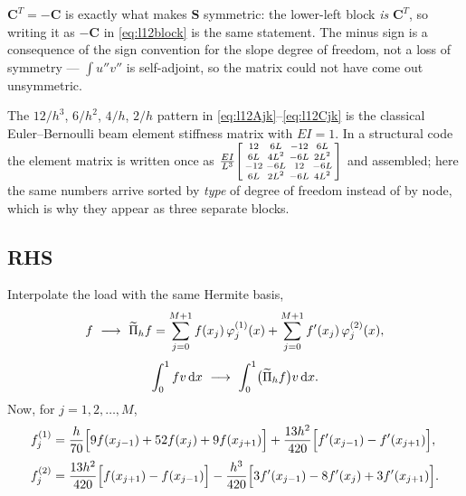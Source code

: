 \begin{pitfall}
$\bm{C}^{T}=-\bm{C}$ is exactly what makes $\bm{S}$ symmetric: the lower-left
block \emph{is} $\bm{C}^{T}$, so writing it as $-\bm{C}$ in
\eqref{eq:l12block} is the same statement. The minus sign is a consequence of
the sign convention for the slope degree of freedom, not a loss of symmetry ---
$\int u''v''$ is self-adjoint, so the matrix could not have come out
unsymmetric.
\end{pitfall}

\begin{mechanics}
The $12/h^{3}$, $6/h^{2}$, $4/h$, $2/h$ pattern in
\eqref{eq:l12Ajk}--\eqref{eq:l12Cjk} is the classical Euler--Bernoulli beam
element stiffness matrix with $EI=1$. In a structural code the element matrix
is written once as
$\frac{EI}{L^{3}}\begin{bsmallmatrix}12&6L&-12&6L\\6L&4L^{2}&-6L&2L^{2}\\
-12&-6L&12&-6L\\6L&2L^{2}&-6L&4L^{2}\end{bsmallmatrix}$
and assembled; here the same numbers arrive sorted by \emph{type} of degree of
freedom instead of by node, which is why they appear as three separate blocks.
\end{mechanics}

\subsection*{RHS}

Interpolate the load with the same Hermite basis,
\begin{equation}\label{eq:l12fint}
  f\ \longrightarrow\ \widetilde{\Pi}_h f
  =\sum_{j=0}^{M+1}f(x_{j})\,\varphi_{j}^{(1)}(x)
   +\sum_{j=0}^{M+1}f'(x_{j})\,\varphi_{j}^{(2)}(x),
\end{equation}
\begin{equation}\label{eq:l12fsub}
  \int_0^1 f v\,\mathrm{d} x\ \longrightarrow\ \int_0^1\bigl(\widetilde{\Pi}_h f\bigr)v\,\mathrm{d} x .
\end{equation}
Now, for $j=1,2,\dots,M$,
\begin{align}
  f_{j}^{(1)}&=\frac{h}{70}\Bigl[9f(x_{j-1})+52f(x_{j})+9f(x_{j+1})\Bigr]
     +\frac{13h^{2}}{420}\Bigl[f'(x_{j-1})-f'(x_{j+1})\Bigr],
     \label{eq:l12f1}\\[0.6ex]
  f_{j}^{(2)}&=\frac{13h^{2}}{420}\Bigl[f(x_{j+1})-f(x_{j-1})\Bigr]
     -\frac{h^{3}}{420}\Bigl[3f'(x_{j-1})-8f'(x_{j})+3f'(x_{j+1})\Bigr].
     \label{eq:l12f2}
\end{align}

